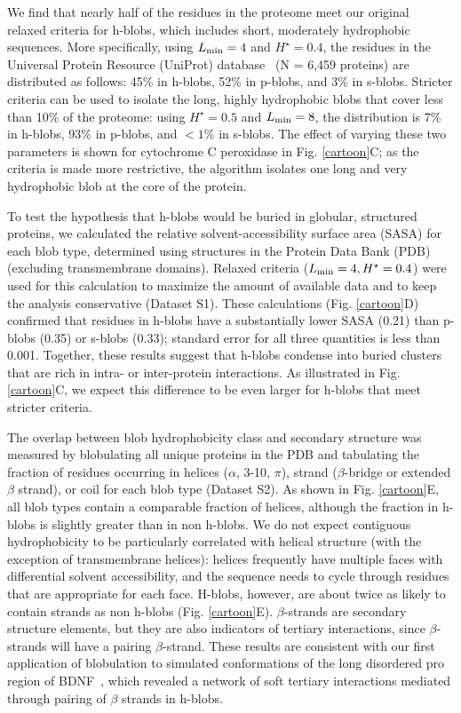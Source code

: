 \documentclass[9pt,twocolumn,twoside,lineno]{pnas-new}
\newcommand{\inserted}[1]{{#1}}
\newcommand{\hydrochar}{hydrophobicity class}
\newcommand{\Ht}{H^{\star}}
\newcommand{\Lmin}{L_{\rm min}}
\begin{document}
\inserted{We find that nearly half of the residues in the proteome meet our original~\cite{Lohia2019} relaxed criteria for h-blobs, which includes short, moderately hydrophobic sequences. More specifically, using $\Lmin=4$ and $\Ht=0.4$, the residues in the Universal Protein Resource (UniProt) database~\cite{Bateman2021} (N = 6,459 proteins) are distributed as follows: 45\% in h-blobs, 52\% in p-blobs, and 3\% in s-blobs. Stricter criteria can be used to isolate the long, highly hydrophobic blobs that cover less than 10\% of the proteome: using $\Ht=0.5$ and $\Lmin=8$, the distribution is 7\% in h-blobs, 93\% in p-blobs, and $<1$\% in s-blobs. The effect of varying these two parameters is shown for cytochrome C peroxidase in Fig. \ref{cartoon}C; as the criteria is made more restrictive, the algorithm isolates one long and very hydrophobic blob at the core of the protein.}

\inserted{To test the hypothesis that h-blobs would be buried in globular, structured proteins, we calculated the relative solvent-accessibility surface area (SASA) for each blob type, determined using structures in the Protein Data Bank (PDB) (excluding transmembrane domains). Relaxed criteria ($\Lmin=4, \Ht=0.4$) were used for this calculation to maximize the amount of available data and to keep the analysis conservative (Dataset S1).  These calculations (Fig. \ref{cartoon}D) confirmed that residues in h-blobs have a substantially lower SASA (0.21) than p-blobs (0.35) or s-blobs (0.33); standard error for all three quantities is less than 0.001. Together, these results suggest that h-blobs condense into buried clusters that are rich in intra- or inter-protein interactions. As illustrated in Fig. \ref{cartoon}C, we expect this difference to be even larger for h-blobs that meet stricter criteria.}

\inserted{The overlap between blob \hydrochar{} and secondary structure was measured by blobulating all unique proteins in the PDB and tabulating the fraction of residues occurring in helices ($\alpha$, 3-10, $\pi$), strand ($\beta$-bridge or extended $\beta$ strand), or coil for each blob type (Dataset S2). 
As shown in Fig. \ref{cartoon}E, all blob types contain a comparable fraction of helices, although the fraction in h-blobs is slightly greater than in non h-blobs. We do not expect contiguous hydrophobicity to be particularly correlated with helical structure (with the exception of transmembrane helices): helices frequently have multiple faces with differential solvent accessibility, and the sequence needs to cycle through residues that are appropriate for each face. H-blobs, however, are about twice as likely to contain strands as non h-blobs (Fig. \ref{cartoon}E). $\beta$-strands are secondary structure elements, but they are also indicators of tertiary interactions, since $\beta$-strands will have a pairing $\beta$-strand. These results are consistent with our first application of blobulation to simulated conformations of the long disordered pro region of BDNF~\cite{Lohia2019}, which revealed a network of soft tertiary interactions mediated through pairing of $\beta$ strands in h-blobs. }
\end{document}
